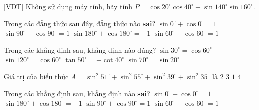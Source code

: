 \begin{bt}%
[VDT]%
	Không sử dụng máy tính, hãy tính $P = \cos 20^{\circ}\cos 40^{\circ} - \sin 140^{\circ}\sin 160^{\circ}.$
\end{bt}

\begin{ex}%
	Trong các đẳng thức sau đây, đẳng thức nào \textbf{sai}? 
	 \choice
		{$\sin  0^\circ+\cos 0^\circ=1$}
		{$\sin 90^\circ+\cos 90^\circ=1$} 
		{$\sin  180^\circ+\cos 180^\circ=-1$}
		 {\True $\sin 60^\circ+\cos 60^\circ=1$}
\end{ex}

\begin{ex}%
	 Trong các khẳng định sau, khẳng định nào đúng?
	 \choice
		{\True $\sin  30^\circ=\cos 60^\circ$}
		{$\sin 120^\circ=\cos 60^\circ$} 
		{$\tan 50^\circ=-\cot  40^\circ$}
		{$\sin  70^\circ=\sin 20^\circ$}
\end{ex}

\begin{ex}%
	Giá trị của biểu thức  $A=\sin^2 51^\circ+\sin^2 55^\circ+\sin^2 39^\circ+\sin^2 35^\circ$ là
	 \choice
		 {\True $2$}
		 {$3$}
		 {$1$}
		 {$4$}
\end{ex}

\begin{ex}%
	Trong các khẳng định sau, khẳng định  nào \textbf{sai}?
	 \choice
		 {$\sin 0^\circ+\cos 0^\circ=1$}
		{$\sin  180^\circ+\cos 180^\circ=-1$}
		{$\sin  90^\circ+\cos 90^\circ=1$}
		{\True $\sin 60^\circ+\cos  60^\circ=1$}
\end{ex}

